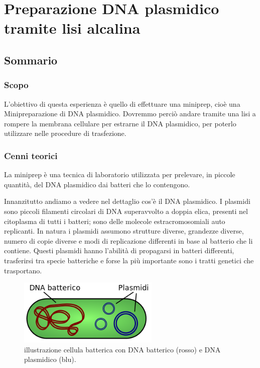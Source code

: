 \chapter{Preparazione DNA plasmidico tramite lisi alcalina}

\vspace{0.6cm}


\section{Sommario}

\subsection{Scopo}

L'obiettivo di questa esperienza è quello di effettuare una miniprep, cioè una Minipreparazione di DNA plasmidico.
Dovremmo perciò andare tramite una lisi a rompere la membrana cellulare per estrarne il DNA plasmidico, per poterlo
utilizzare nelle procedure di trasfezione.

\subsection{Cenni teorici}

La miniprep è una tecnica di laboratorio utilizzata per prelevare, in piccole quantità,
del DNA plasmidico dai batteri che lo contengono.

Innanzitutto andiamo a vedere nel dettaglio cos'è il DNA plasmidico.
I plasmidi sono piccoli filamenti circolari di DNA superavvolto a doppia elica,
presenti nel citoplasma di tutti i batteri;
sono delle molecole estracromosomiali auto replicanti.
In natura i plasmidi assumono strutture diverse, grandezze diverse, numero di copie diverse e modi
di replicazione differenti in base al batterio che li contiene.
Questi plasmidi hanno l'abilità di propagarsi in batteri differenti, trasferirsi tra specie
batteriche e forse la più importante sono i tratti genetici che trasportano.

\begin{figure}[H]

	\centering
	\includegraphics[width=0.6\textwidth]{./immagini/plasmide.png}
	\caption{illustrazione cellula batterica con DNA batterico (rosso) e DNA plasmidico (blu).}
	\label{plasmide}

\end{figure}

